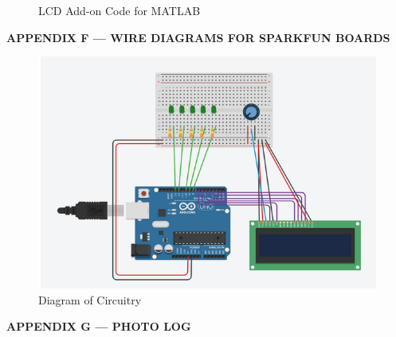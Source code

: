 \documentclass[conference]{IEEEtran}
\begin{document}
\begin{figure}[h!]
  \caption{LCD Add-on Code for MATLAB}
\end{figure}
\vspace{-15pt}


\newpage


 \hspace{.5in}   \textbf{APPENDIX F — WIRE DIAGRAMS FOR SPARKFUN BOARDS}  

 \begin{figure}[H]
   \centering
   \includegraphics[width=.9\textwidth]{Figures/WireDiagram1.png}
   \caption{Diagram of Circuitry}
   \label{fig:3}
 \end{figure}

 \newpage


 \hspace{.5in}   \textbf{APPENDIX G — PHOTO LOG}  
\end{document}
